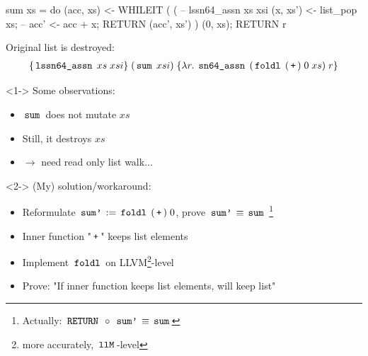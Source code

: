 \documentclass[aspectratio=169, 11pt]{beamer}
\newcommand{\spnote}[1]{\pdfcomment[icon=Note,color=yellow,opacity=1]{#1}}
\newcommand{\spnote}[1]{}
\begin{document}
\begin{frame}[fragile]
\begin{isabellecode}[basicstyle=\ttfamily\scriptsize]
sum xs = do {
  (acc, xs) <- WHILEIT (%
    (%
      -- { lssn64_assn xs xsi }
      (x, xs') <- list_pop xs;
      -- { %
      acc' <- acc + x;
      RETURN (acc', xs')
    }) (0, xs);
  RETURN r
}
\end{isabellecode}
Original list is destroyed:
\begin{align*}
    \{\,\text{\ttfamily lssn64\_assn}\, \; xs \; xsi\}
    \; (\,\text{\ttfamily sum}\, \; xsi) \;
    \{\lambda r. \; \,\text{\ttfamily sn64\_assn}\, \; (\,\text{\ttfamily foldl}\, \; (\,\text{\ttfamily +}\,) \; 0 \; xs) \; r\}
\end{align*}
\spnote{
    End: 20:00
}
\end{frame}

\begin{frame}
    \begin{uncoverenv}<1->
    Some observations:
    \begin{itemize}
        \item $\,\text{\ttfamily sum}\,$ does not mutate $xs$
        \item Still, it destroys $xs$
        \item $\rightarrow$ need read only list walk...
    \end{itemize}
    \end{uncoverenv}
    \begin{uncoverenv}<2->
    (My) solution/workaround:
    \begin{itemize}
        \item Reformulate $\,\text{\ttfamily sum'}\, := \,\text{\ttfamily foldl}\, \; (\,\text{\ttfamily +}\,) \; 0$, prove $\,\text{\ttfamily sum'}\, \equiv \,\text{\ttfamily sum}\,$ \footnote{Actually: $\,\text{\ttfamily RETURN}\, \; \circ \; \,\text{\ttfamily sum'}\, \equiv \,\text{\ttfamily sum}\,$}
        \item Inner function "$\,\text{\ttfamily +}\,$" keeps list elements
        \item Implement $\,\text{\ttfamily foldl}\,$ on LLVM\footnote{more accurately, $\,\text{\ttfamily llM}\,$-level}-level
        \item Prove: "If inner function keeps list elements,  will keep list"
    \end{itemize}
    \end{uncoverenv}
    \spnote{
        End: 22:00
    }
\end{frame}
\end{document}
